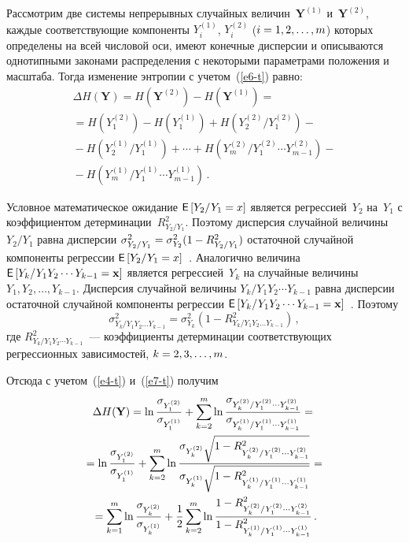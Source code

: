 \begin{multicols}{2}
  Рассмотрим две системы непрерывных случайных 
величин~$\mathbf{Y}^{(1)}$ и~$\mathbf{Y}^{(2)}$, каждые соответствующие 
компоненты $Y_i^{(1)}$, $Y_i^{(2)}$ ($i\hm=1, 2,\ldots , m$) которых 
определены на всей числовой оси, имеют конечные дисперсии и описываются 
однотипными законами распределения с некоторыми параметрами положения и 
масштаба. Тогда изменение энтропии с учетом~(\ref{e6-t}) равно:
  \begin{multline*}
  \Delta H(\mathbf{Y}) =H\left(\mathbf{Y}^{(2)}\right) -H\left(\mathbf{Y}^{(1)}\right) 
={}\\
{}=
H\left(Y_1^{(2)}\right) -H\left(Y_1^{(1)}\right) +H\left(Y_2^{(2)}/Y_1^{(2)}\right)-{}\\
  {}- H\left( Y_2^{(1)}/Y_1^{(1)}\right) +\cdots + 
H\left(Y_m^{(2)}/Y_1^{(2)}\cdots Y_{m-1}^{(2)}\right) -{}\\
{}- H\left( Y_m^{(1)}/Y_1^{(1)}\cdots Y_{m-
1}^{(1)}\right)\,.
  \end{multline*}
  
  Условное математическое ожидание ${\sf E}\left[ Y_2/Y_1\hm=x\right]$ является 
регрессией~$Y_2$ на~$Y_1$ с коэффициентом 
детерминации~$R^2_{Y_2/Y_1}$. Поэтому дисперсия случайной величины 
$Y_2/Y_1$ равна дисперсии $\sigma^2_{Y_2/Y_1} \hm= \sigma^2_{Y_2}
  (1-R^2_{Y_2/Y_1})$ остаточной случайной компоненты регрессии ${\sf E}\left[ 
Y_2/Y_1=x\right]$~\cite{12-t}. Аналогично величина ${\sf E}\left[ Y_k/Y_1Y_2\cdots 
Y_{k-1}=\mathbf{x}\right]$ является регрессией~$Y_k$ на случайные величины 
$Y_1, Y_2,\ldots , Y_{k-1}$. Дисперсия случайной величины $Y_k/Y_1Y_2\cdots 
Y_{k-1}$ равна дисперсии остаточной случайной компоненты регрессии 
${\sf E}\left[ Y_k/Y_1Y_2\cdots Y_{k-1}=\mathbf{x}\right]$~\cite{12-t}. Поэтому
  \begin{equation}
  \sigma^2_{Y_k/Y_1Y_2\ldots Y_{k-1}}=\sigma^2_{Y_k}(1-
R^2_{Y_k/Y_1Y_2\ldots Y_{k-1}})\,,
  \label{e7-t}
  \end{equation}
  где $ R^2_{Y_k/Y_1Y_2\cdots Y_{k-1}}$~--- коэффициенты детерминации 
соответствующих регрессионных зависимостей, $k\hm=2, 3, \ldots , m$.
  
  Отсюда с учетом~(\ref{e4-t}) и~(\ref{e7-t}) получим
  \begin{multline*}
  \Delta H(\mathbf{Y}) =\ln \displaystyle\frac{\displaystyle \sigma_{Y_1^{(2)}}\mathstrut}{\displaystyle \sigma_{Y_1^{(1)}}\mathstrut}+
  \sum\limits_{k=2}^m \ln \displaystyle\frac{\displaystyle \sigma_{Y_k^{(2)}/Y_1^{(2)}\cdots Y_{k-
1}^{(2)}}\mathstrut}{\displaystyle \sigma_{Y_k^{(1)}/Y_1^{(1)}\cdots Y_{k-1}^{(1)}}\mathstrut} = {}\\
{}=
  \ln \displaystyle\frac{\displaystyle \sigma_{Y_1^{(2)}}\mathstrut}{\displaystyle \sigma_{Y_1^{(1)}}\mathstrut}+\sum\limits_{k=2}^m 
  \ln \displaystyle\frac{\displaystyle \sigma_{Y_k^{(2)}}\sqrt{1-R^2_{Y_k^{(2)}/Y_1^{(2)}\cdots 
  Y_{k-1}^{(2)}}}\mathstrut}{\displaystyle \sigma_{Y_k^{(1)}}\sqrt{1-R^2_{Y_k^{(1)}/Y_1^{(1)}\cdots 
Y_{k-1}^{(1)}}}\mathstrut}={}\\
  {}=\sum\limits_{k=1}^m \ln 
\displaystyle\frac{\displaystyle \sigma_{Y_k^{(2)}}\mathstrut}{\displaystyle \sigma_{Y_k^{(1)}}\mathstrut}+\displaystyle\frac{\displaystyle 1\mathstrut}{\displaystyle 2\mathstrut}\sum\limits_{k=2}^m 
  \ln \displaystyle\frac{\displaystyle 1-R^2_{Y_k^{(2)}/Y_1^{(2)}\cdots Y_{k-1}^{(2)}}\mathstrut}{\displaystyle 1-
R^2_{Y_k^{(1)}/Y_1^{(1)}\cdots Y_{k-1}^{(1)}}\mathstrut}\,.
  \end{multline*}
  

\end{multicols}
